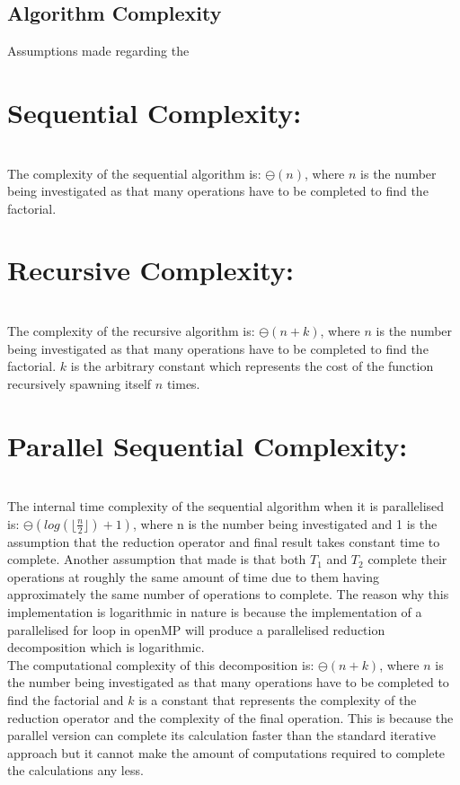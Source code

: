 \documentclass[11pt]{article}
\begin{document}
\begin{page}
\break

\section{Algorithm Complexity}
Assumptions made regarding the 
\noindent \chapter{Sequential Complexity:} \\
The complexity of the sequential algorithm is: $\ominus(n)$, where $n$ is the number being investigated as that many operations have to be completed to find the factorial.\\

\noindent \chapter{Recursive Complexity:} \\
The complexity of the recursive algorithm is: $\ominus(n + k)$, where $n$ is the number being investigated as that many operations have to be completed to find the factorial. $k$ is the arbitrary constant which represents the cost of the function recursively spawning itself $n$ times.\\

\noindent \chapter{Parallel Sequential Complexity:} \\
The internal time complexity of the sequential algorithm when it is parallelised is: $\ominus(log(\lfloor{\frac{n}{2}}\rfloor) + 1)$, where n is the number being investigated and 1 is the assumption that the reduction operator and final result takes constant time to complete. Another assumption that made is that both $T_1$ and $T_2$ complete their operations at roughly the same amount of time due to them having approximately the same number of operations to complete. The reason why this implementation is logarithmic in nature is because the implementation of a parallelised for loop in openMP will produce a parallelised reduction decomposition which is logarithmic.\\

\noindent The computational complexity of this decomposition is: $\ominus(n + k)$, where $n$ is the number being investigated as that many operations have to be completed to find the factorial and $k$ is a constant that represents the complexity of the reduction operator and the complexity of the final operation. This is because the parallel version can complete its calculation faster than the standard iterative approach but it cannot make the amount of computations required to complete the calculations any less.\\


\end{page}
\end{document}
